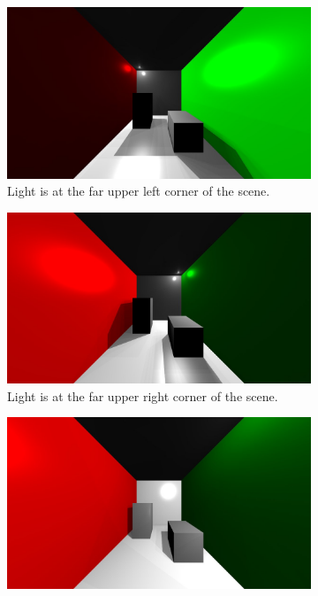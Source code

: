 \begin{figure}
        \centering
        \begin{subfigure}[b]{0.5\textwidth}
                \includegraphics[width=\textwidth]{sample2.jpg}
                \caption{Light is at the far upper left corner of the scene.}
                \label{fig:sample2}
        \end{subfigure}
        \begin{subfigure}[b]{0.5\textwidth}
                \includegraphics[width=\textwidth]{sample3.jpg}
                \caption{Light is at the far upper right corner of the scene.}
                \label{fig:sample3}
        \end{subfigure}
        \begin{subfigure}[b]{0.5\textwidth}
                \includegraphics[width=\textwidth]{sample4.jpg}

\end{subfigure}
\end{figure}
